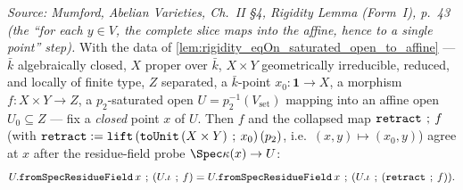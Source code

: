 \begin{lemma}
  \label{lem:rigidity_eqAt_closedPoint_of_proper_into_affine}

  \textit{Source: Mumford, Abelian Varieties, Ch.~II \S4, Rigidity Lemma (Form~I), p.~43 (the
  ``for each \(y \in V\), the complete slice maps into the affine, hence to a single point'' step).}
  With the data of \cref{lem:rigidity_eqOn_saturated_open_to_affine} --- \(\bar k\) algebraically
  closed, \(X\) proper over \(\bar k\), \(X \times Y\) geometrically irreducible, reduced, and locally of
  finite type, \(Z\) separated, a \(\bar k\)-point \(x_0 \colon \mathbf 1 \to X\), a morphism
  \(f \colon X \times Y \to Z\), a \(p_2\)-saturated open \(U = p_2^{-1}(V_{\mathrm{set}})\) mapping into an
  affine open \(U_0 \subseteq Z\) --- fix a \emph{closed} point \(x\) of \(U\). Then \(f\) and the collapsed
  map \(\mathtt{retract} \fatsemi f\) (with \(\mathtt{retract} := \mathtt{lift}\,
  (\mathtt{toUnit}\,(X \times Y) \fatsemi x_0)\,(p_2)\), i.e.\ \((x, y) \mapsto (x_0, y)\)) agree at \(x\)
  after the residue-field probe \(\Spec \kappa(x) \to U\):
  \[ U.\mathtt{fromSpecResidueField}\,x \fatsemi (U.\iota \fatsemi f)
     = U.\mathtt{fromSpecResidueField}\,x \fatsemi (U.\iota \fatsemi (\mathtt{retract} \fatsemi f)). \]
\end{lemma}
